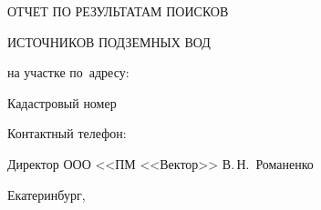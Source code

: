 

\setlength{\extrarowheight}{1mm} %


\begin{titlepage}
	\begin{center}
		\textbf{\txtExecutor}
		\vspace{7.5cm}
		
		{\LARGE ОТЧЕТ ПО РЕЗУЛЬТАТАМ ПОИСКОВ}

		\bigskip

		{\LARGE ИСТОЧНИКОВ ПОДЗЕМНЫХ ВОД}
		
		\bigskip
		
		на участке по~адресу:
		\bigskip
				
		\textit{\txtAddress}
		
		\bigskip
		Кадастровый номер \txtCadaster
		\bigskip

		Контактный телефон: \txtPhoneNumber
		
		\vfill
	
		\bigskip
		
	\end{center}

	\vfill
	
	\newlength{\ML}
	\hfill
	\begin{minipage}{1.0\textwidth}
		Директор ООО <<ПМ <<Вектор>> 
		\underline{\hspace{\ML}} В.\,Н.~Романенко\\

	\end{minipage}%
	
	\bigskip
	
	\vfill
	\begin{center}
		Екатеринбург, \txtYear
	\end{center}			

	\end{titlepage}

\tableofcontents

